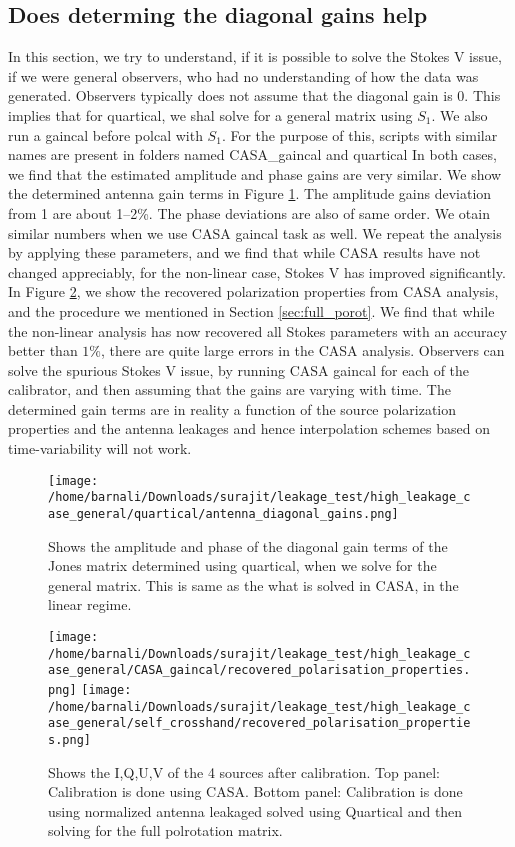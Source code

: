 \documentclass{article}
\begin{document}
\subsection{Does determing the diagonal gains help}

In this section, we try to understand, if it is possible to solve the Stokes V issue, if we were general observers, who had no understanding of how the data was generated. Observers typically does not assume that the diagonal gain is 0. This implies that for quartical, we shal solve for a general matrix using $S_1$. We also run a gaincal before polcal with $S_1$. For the purpose of this, scripts with similar names are present in folders named CASA\_gaincal and quartical In both cases, we find that the estimated amplitude and phase gains are very similar. We show the determined antenna gain terms in Figure \ref{fig:quartical_ant_gains}. The amplitude gains deviation from 1 are about 1--2\%. The phase deviations are also of same order. We otain similar numbers when we use CASA gaincal task as well. We repeat the analysis by applying these parameters, and we find that while CASA results have not changed appreciably, for the non-linear case, Stokes V has improved significantly. In Figure \ref{fig:compare_linear_nonlinear_terms_with_diagonal}, we show the recovered polarization properties from CASA analysis, and the procedure we mentioned in Section \ref{sec:full_porot}. We find that while the non-linear analysis has now recovered all Stokes parameters with an accuracy better than $1\%$, there are quite large errors in the CASA analysis. Observers can solve the spurious Stokes V issue, by running CASA gaincal for each of the calibrator, and then assuming that the gains are varying with time. The determined gain terms are in reality a function of the source polarization properties and the antenna leakages and hence interpolation schemes based on time-variability will not work. 
 
\begin{figure}
\centering
\texttt{[image: /home/barnali/Downloads/surajit/leakage\_test/high\_leakage\_case\_general/quartical/antenna\_diagonal\_gains.png]}
\caption{Shows the amplitude and phase of the diagonal gain terms of the Jones matrix determined using quartical, when we solve for the general matrix. This is same as the what is solved in CASA, in the linear regime.}
\label{fig:quartical_ant_gains}
\end{figure}


\begin{figure}
\centering
\texttt{[image: /home/barnali/Downloads/surajit/leakage\_test/high\_leakage\_case\_general/CASA\_gaincal/recovered\_polarisation\_properties.png]}
\texttt{[image: /home/barnali/Downloads/surajit/leakage\_test/high\_leakage\_case\_general/self\_crosshand/recovered\_polarisation\_properties.png]}
\caption{Shows the I,Q,U,V of the 4 sources after calibration. Top panel: Calibration is done using CASA. Bottom panel: Calibration is done using normalized antenna leakaged solved using Quartical and then solving for the full polrotation matrix.}
\label{fig:compare_linear_nonlinear_terms_with_diagonal}
\end{figure}
\end{document}
